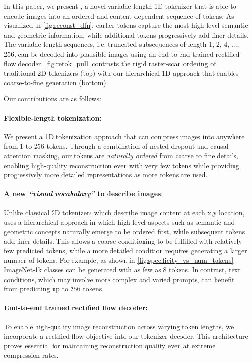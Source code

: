 In this paper, we present \ours, a novel variable-length 1D tokenizer that is able to encode images into an ordered and content-dependent sequence of tokens. As visualized in \cref{fig:reconst_dfn}, earlier tokens capture the most high-level semantic and geometric information, while additional tokens progressively add finer details. The variable-length sequences, i.e. truncated subsequences of length 1, 2, 4, ..., 256, can be decoded into plausible images using an end-to-end trained rectified flow decoder. \cref{fig:retok_pull} contrasts the rigid raster-scan ordering of traditional 2D tokenizers
(top) with our hierarchical 1D approach that enables coarse-to-fine generation (bottom).

Our contributions are as follows:

\paragraph{Flexible-length tokenization:} We present a 1D tokenization approach that can compress images into anywhere from 1 to 256 tokens. Through a combination of nested dropout and causal attention masking, our tokens are \textit{naturally ordered} from coarse to fine details, enabling high-quality reconstruction even with very few tokens while providing progressively more detailed representations as more tokens are used.


\paragraph{A new \textit{``visual vocabulary''} to describe images:} Unlike classical 2D tokenizers which describe image content at each x,y location, \ours uses a hierarchical approach in which high-level aspects such as semantic and geometric concepts naturally emerge to be ordered first, while subsequent tokens add finer details. This allows a coarse conditioning to be fulfilled with relatively few predicted tokens, while a more detailed condition requires generating a larger number of tokens. For example, as shown in \cref{fig:specificity_vs_num_tokens}, ImageNet-1k classes can be generated with as few as 8 tokens. In contrast, text conditions, which may involve more complex and varied prompts, can benefit from predicting up to 256 tokens.

\paragraph{End-to-end trained rectified flow decoder:} To enable high-quality image reconstruction across varying token lengths, we incorporate a rectified flow objective into our tokenizer decoder. This architecture proves essential for maintaining reconstruction quality even at extreme compression rates.
